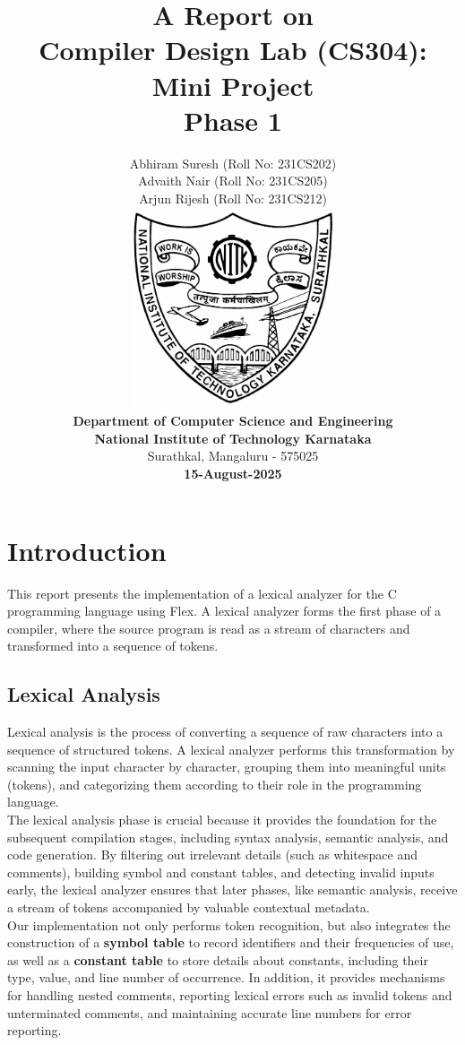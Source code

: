 \documentclass[12pt,a4paper]{article}
\title{\textbf{A Report on\\Compiler Design Lab (CS304): Mini Project\\Phase 1}}
\author{
Abhiram Suresh (Roll No: 231CS202)\\
Advaith Nair (Roll No: 231CS205)\\
Arjun Rijesh (Roll No: 231CS212)\\[0.5cm]
\includegraphics[width=6cm]{nitk_logo.png} \\[0.5cm]
\textbf{Department of Computer Science and Engineering}\\
\textbf{National Institute of Technology Karnataka}\\
Surathkal, Mangaluru - 575025\\[0.5cm]
\textbf{15-August-2025}\\[5cm]
}
\date{}
\begin{document}
\maketitle

\vspace{5cm}

\section{Introduction}
This report presents the implementation of a lexical analyzer for the C programming
language using Flex. A lexical analyzer forms the first phase of a compiler,
where the source program is read as a stream of characters and transformed into a
sequence of tokens.

\subsection{Lexical Analysis}
Lexical analysis is the process of converting a sequence of raw characters into a sequence of structured tokens. A lexical analyzer performs this transformation
by scanning the input character by character, grouping them into meaningful units
(tokens), and categorizing them according to their role in the programming language.\\
The lexical analysis phase is crucial because it provides the foundation for the subsequent compilation stages, including syntax analysis, semantic analysis, and code generation. By filtering out irrelevant details (such as whitespace and comments), building symbol and constant tables, and detecting invalid inputs early, the lexical analyzer ensures that later phases, like semantic analysis, receive a stream of tokens accompanied by valuable contextual metadata.\\
Our implementation not only performs token recognition, but also integrates the construction of a \textbf{symbol table} to record identifiers and their frequencies of use, as well as a \textbf{constant table} to store details about constants, including their type, value, and line number of occurrence. In addition, it provides mechanisms for handling nested comments, reporting lexical errors such as invalid tokens and unterminated comments, and maintaining accurate line numbers for error reporting.
\end{document}
